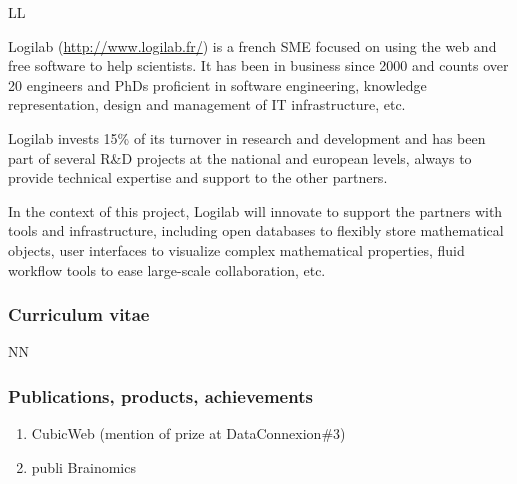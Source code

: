 \begin{sitedescription}{LL}

Logilab (\url{http://www.logilab.fr/}) is a french SME focused on using the web and free software to help
scientists. It has been in business since 2000 and counts over 20 engineers and
PhDs proficient in software engineering, knowledge representation, design and
management of IT infrastructure, etc.

Logilab invests 15\% of its turnover in research and development and has been
part of several R\&D projects at the national and european levels, always to
provide technical expertise and support to the other partners.

In the context of this project, Logilab will innovate to support the partners
with tools and infrastructure, including open databases to flexibly store
mathematical objects, user interfaces to visualize complex mathematical
properties, fluid workflow tools to ease large-scale collaboration, etc.



\subsubsection*{Curriculum vitae}







\begin{participant}[type=res,PM=30]{NN}
\end{participant}


\subsubsection*{Publications, products, achievements}

\begin{enumerate}
\item CubicWeb (mention of prize at DataConnexion\#3)
\item publi Brainomics
\end{enumerate}


\end{sitedescription}
